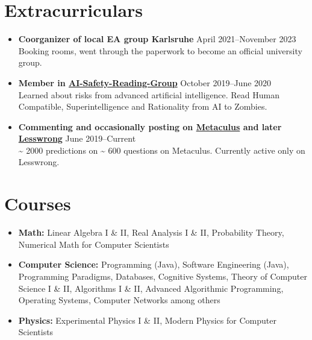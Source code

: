 \documentclass[letterpaper,10pt]{article}
\begin{document}
\section*{Extracurriculars}
  \begin{itemize}
      \item {\textbf{Coorganizer of local EA group Karlsruhe}} \hfill April 2021--November 2023 \\
      {Booking rooms, went through the paperwork to become an official university group.}
      \item {\textbf{Member in \href{https://aisafety.com/}{AI-Safety-Reading-Group}}} \hfill October 2019--June 2020 \\
      {Learned about risks from advanced artificial intelligence. Read Human Compatible, Superintelligence and Rationality from AI to Zombies.}
      \item {\textbf{Commenting and occasionally posting on \href{https://www.metaculus.com/accounts/profile/106992/}{Metaculus} and later \href{https://www.lesswrong.com/users/morpheus}{Lesswrong}}} \hfill June 2019--Current \\
      {\textasciitilde{} 2000 predictions on \textasciitilde{} 600 questions on Metaculus. Currently active only on Lesswrong.}
  \end{itemize}
\fi

\section*{Courses}
\begin{itemize}
    \item \textbf{Math:} Linear Algebra I \& II, Real Analysis I \& II, Probability Theory, Numerical Math for Computer Scientists
    \item \textbf{Computer Science:} Programming (Java), Software Engineering (Java), Programming Paradigms, Databases, Cognitive Systems, Theory of Computer Science I \& II, Algorithms I \& II, Advanced Algorithmic Programming, Operating Systems, Computer Networks among others
    \item \textbf{Physics:} Experimental Physics I \& II, Modern Physics for Computer Scientists
\end{itemize}
\end{document}
